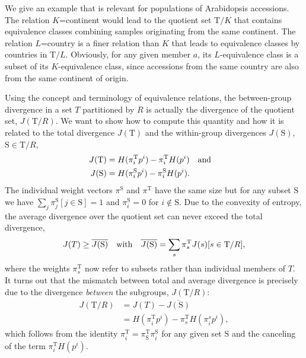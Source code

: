 \documentclass[a4paper]{article}
\newcommand{\set}{\mathrm}
\newcommand{\qset}[2]{\set{#1}/#2}
\begin{document}
We give an example that is relevant for populations of Arabidopsis
accessions. The relation $K$=continent would lead to the quotient set
$\qset{T}{K}$ that contains equivalence classes combining samples
originating from the same continent. The relation $L$=country is a
finer relation than $K$ that leads to equivalence classes by countries
in $\qset{T}{L}$. Obviously, for any given member $a$, its
$L$-equivalence class is a subset of its $K$-equivalence class, since
accessions from the same country are also from the same continent of
origin.

Using the concept and terminology of equivalence relations, the
between-group divergence in a set $T$ partitioned by $R$ is actually
the divergence of the quotient set, $J(\qset{T}{R})$. We want to show
how to compute this quantity and how it is related to the total
divergence $J(\set{T})$ and the within-group divergences $J(\set{S})$,
$\set{S} \in \qset{T}{R}$,
\begin{align}
  J(\set{T}) &= H(\pi_i^\set{T}p^i) - \pi_i^\set{T} H(p^i) \qq{and} \\
  J(\set{S}) &= H(\pi_i^\set{S}p^i) - \pi_i^\set{S} H(p^i).
\end{align}
The individual weight vectors $\pi^\set{S}$ and $\pi^\set{T}$ have the
same size but for any subset $\set{S}$ we have $\sum_j \pi^\set{S}_j[j
\in \set{S}] = 1$ and $\pi^\set{S}_i = 0$ for $i \notin \set{S}$. Due
to the convexity of entropy, the average divergence over the quotient
set can never exceed the total divergence,
\begin{equation}
  \label{eq:jsd-avg}
  J(T) \geq \overline{J(\set{S})} \qq{with} \overline{J(\set{S})} = \sum_s\pi^\set{T}_s J(s) [s\in\qset{T}{R}],
\end{equation}
where the weights $\pi_s^\set{T}$ now refer to subsets rather than
individual members of $T$.  It turns out that the mismatch between
total and average divergence is precisely due to the divergence
\emph{between} the subgroups, $J(\qset{T}{R})$:
\begin{align}
  J(\qset{T}{R}) &= J(T) - \overline{J(\set{S})} \\
  &= H(\pi_i^\set{T}p^i) - \pi^\set{T}_s H(\pi_i^s p^i),
\end{align}
which follows from the identity $\pi_i^\set{T} = \pi_\set{S}^\set{T}
\pi^\set{S}_i$ for any given set $\set{S}$ and the canceling of the
term $\pi_i^\set{T} H(p^i)$.
\end{document}
